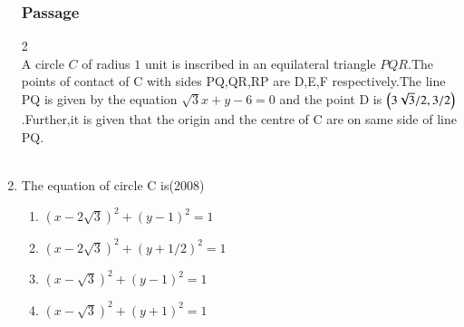 \documentclass[journal]{IEEEtran}
\numberwithin{equation}{enumi}
\numberwithin{figure}{enumi}
\begin{document}
\begin{enumerate}
\subsubsection{Passage } 2\\
A circle $C$ of radius $1$ unit is inscribed in an equilateral triangle $PQR$.The points of contact of C with sides PQ,QR,RP are D,E,F respectively.The line PQ is given by the equation $\sqrt{3}x+y-6=0$ and the point D is $\left(3\sqrt{3}/2 , 3/2\right)$.Further,it is given that the origin and the centre of C are on same side of line PQ.\\
\\
\item The equation of circle C is\hfill(2008)
\begin{enumerate}
\item $(x-2\sqrt{3})^2 + (y-1)^2=1$
\item $(x-2\sqrt{3})^2 + (y+1/2)^2=1$
\item $(x-\sqrt{3})^2 + (y-1)^2=1$
\item $(x-\sqrt{3})^2 + (y+1)^2=1$
\end{enumerate}
\end{enumerate}
\end{document}
